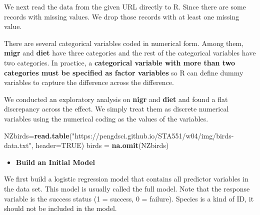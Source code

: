 \documentclass[
]{book}
\newenvironment{Shaded}{\begin{snugshade}}{\end{snugshade}}
\newcommand{\AttributeTok}[1]{\textcolor[rgb]{0.13,0.29,0.53}{#1}}
\newcommand{\ConstantTok}[1]{\textcolor[rgb]{0.56,0.35,0.01}{#1}}
\newcommand{\FunctionTok}[1]{\textcolor[rgb]{0.13,0.29,0.53}{\textbf{#1}}}
\newcommand{\NormalTok}[1]{#1}
\newcommand{\OtherTok}[1]{\textcolor[rgb]{0.56,0.35,0.01}{#1}}
\newcommand{\SpecialCharTok}[1]{\textcolor[rgb]{0.81,0.36,0.00}{\textbf{#1}}}
\newcommand{\StringTok}[1]{\textcolor[rgb]{0.31,0.60,0.02}{#1}}
\providecommand{\tightlist}{%
  \setlength{\itemsep}{0pt}\setlength{\parskip}{0pt}}
\begin{document}
We next read the data from the given URL directly to R. Since there are some records with missing values. We drop those records with at least one missing value.

There are several categorical variables coded in numerical form. Among them, \textbf{migr} and \textbf{diet} have three categories and the rest of the categorical variables have two categories. In practice, a \textbf{categorical variable with more than two categories must be specified as factor variables} so R can define dummy variables to capture the difference across the difference.

We conducted an exploratory analysis on \textbf{nigr} and \textbf{diet} and found a flat discrepancy across the effect. We simply treat them as discrete numerical variables using the numerical coding as the values of the variables.

\begin{Shaded}
\begin{Highlighting}[]
\NormalTok{NZbirds}\OtherTok{=}\FunctionTok{read.table}\NormalTok{(}\StringTok{"https://pengdsci.github.io/STA551/w04/img/birds{-}data.txt"}\NormalTok{, }\AttributeTok{header=}\ConstantTok{TRUE}\NormalTok{)}
\NormalTok{birds }\OtherTok{=} \FunctionTok{na.omit}\NormalTok{(NZbirds)}
\end{Highlighting}
\end{Shaded}

\begin{itemize}
\tightlist
\item
  \textbf{Build an Initial Model}
\end{itemize}

We first build a logistic regression model that contains all predictor variables in the data set. This model is usually called the full model. Note that the response variable is the success status (1 = success, 0 = failure). Species is a kind of ID, it should not be included in the model.

\begin{Shaded}
\end{Shaded}
\end{document}
